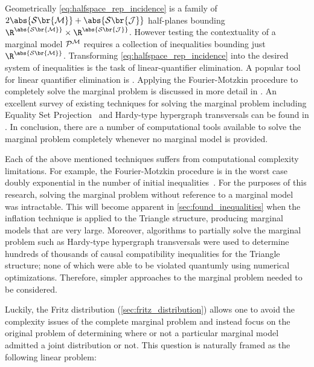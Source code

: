 \documentclass[aps, 10pt, english, twoside, pra, nofootinbib, tightenlines, longbibliography, superscriptaddress]{revtex4-1}
\renewcommand{\Events}[1]{\mathcal{S}\br{#1}} %
\begin{document}
    Geometrically \cref{eq:halfspace_rep_incidence} is a family of $2\abs{\Events{\mscenario}} + \abs{\Events{\jointvar}}$ half-planes bounding $\R^{\abs{\Events{\mscenario}}} \times \R^{\abs{\Events{\jointvar}}}$. However testing the contextuality of a marginal model $\probvec^{\mscenario}$ requires a collection of inequalities bounding just $\R^{\abs{\Events{\mscenario}}}$. Transforming \cref{eq:halfspace_rep_incidence} into the desired system of inequalities is the task of linear-quantifier elimination. A popular tool for linear quantifier elimination is  \cite{Dantzig_1973,Inflation,Abramsky_2012,jones_2004}. Applying the Fourier-Motzkin procedure to completely solve the marginal problem is discussed in more detail in \citet{Fritz_2011}. An excellent survey of existing techniques for solving the marginal problem including Equality Set Projection~\cite{jones_2004} and Hardy-type hypergraph transversals can be found in \citet{Inflation}. In conclusion, there are a number of computational tools available to solve the marginal problem completely whenever no marginal model is provided.

    Each of the above mentioned techniques suffers from computational complexity limitations. For example, the Fourier-Motzkin procedure is in the worst case doubly exponential in the number of initial inequalities~\cite{Dantzig_1973}. For the purposes of this research, solving the marginal problem without reference to a marginal model was intractable. This will become apparent in \cref{sec:found_inequalities} when the inflation technique is applied to the Triangle structure, producing marginal models that are very large. Moreover, algorithms to partially solve the marginal problem such as Hardy-type hypergraph transversals were used to determine hundreds of thousands of causal compatibility inequalities for the Triangle structure; none of which were able to be violated quantumly using numerical optimizations. Therefore, simpler approaches to the marginal problem needed to be considered.

    Luckily, the Fritz distribution (\cref{sec:fritz_distribution}) allows one to avoid the complexity issues of the complete marginal problem and instead focus on the original problem of determining where or not a particular marginal model admitted a joint distribution or not. This question is naturally framed as the following linear problem:
\end{document}
